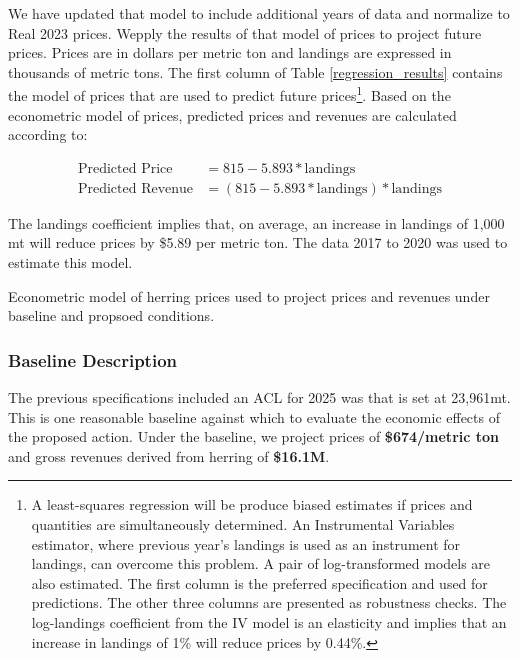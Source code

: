 \documentclass[
  12pt,
]{article}
\begin{document}
We have updated that model to include additional years of data and
normalize to Real 2023 prices. Wepply the results of that model of
prices to project future prices. Prices are in dollars per metric ton
and landings are expressed in thousands of metric tons. The first column
of Table \ref{regression_results} contains the model of prices that are
used to predict future prices\footnote{A least-squares regression will
  be produce biased estimates if prices and quantities are
  simultaneously determined. An Instrumental Variables estimator, where
  previous year's landings is used as an instrument for landings, can
  overcome this problem. A pair of log-transformed models are also
  estimated. The first column is the preferred specification and used
  for predictions. The other three columns are presented as robustness
  checks. The log-landings coefficient from the IV model is an
  elasticity and implies that an increase in landings of 1\% will reduce
  prices by 0.44\%.}. Based on the econometric model of prices,
predicted prices and revenues are calculated according to:

\begin{align}
\mbox{Predicted Price} &= 815 - 5.893*\mbox{landings}\label{eq:predicted_price}\\
\mbox{Predicted Revenue} &=  (815 - 5.893*\mbox{landings}) *\mbox{landings}\label{eq:predicted_landings}
\end{align}

The landings coefficient implies that, on average, an increase in
landings of 1,000 mt will reduce prices by \$5.89 per metric ton. The
data 2017 to 2020 was used to estimate this model.

\begin{table}[htbp]
  \begin{center}
    
     \caption{Econometric model of herring prices used to project prices and revenues under baseline and propsoed conditions. \label{regression_results}}
  \end{center}
\end{table}

\hypertarget{baseline-description}{%
\subsubsection{Baseline Description}\label{baseline-description}}

The previous specifications included an ACL for 2025 was that is set at
23,961mt. This is one reasonable baseline against which to evaluate the
economic effects of the proposed action. Under the baseline, we project
prices of \textbf{\$674/metric ton} and gross revenues derived from
herring of \textbf{\$16.1M}.
\end{document}
